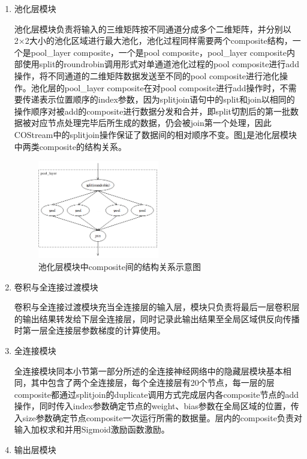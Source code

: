 \begin{enumerate}
\item 池化层模块

池化层模块负责将输入的三维矩阵按不同通道分成多个二维矩阵，并分别以2×2大小的池化区域进行最大池化，池化过程同样需要两个composite结构，一个是pool\_layer composite，一个是pool composite，pool\_layer composite内部使用split的roundrobin调用形式对单通道池化过程的pool composite进行add操作，将不同通道的二维矩阵数据发送至不同的pool composite进行池化操作。池化层的pool\_layer composite在对pool composite进行add操作时，不需要传递表示位置顺序的index参数，因为splitjoin语句中的split和join以相同的操作顺序对被add的composite进行数据分发和合并，即split切割后的第一批数据被对应节点处理完毕后所生成的数据，仍会被join第一个处理，因此COStream中的splitjoin操作保证了数据间的相对顺序不变。图\ref{fig:cnn_pooling_layer}是池化层模块中两类composite的结构关系。

\begin{figure}[!t]
\centering
\includegraphics[width=0.5\textwidth]{../img/Chap_Application/Yu/cnn_pooling_layer.png}
\caption{池化层模块中composite间的结构关系示意图}
\label{fig:cnn_pooling_layer}
\end{figure}

\item 卷积与全连接过渡模块

卷积与全连接过渡模块充当全连接层的输入层，模块只负责将最后一层卷积层的输出结果转发给下层全连接层，同时记录此输出结果至全局区域供反向传播时第一层全连接层参数梯度的计算使用。

\item 全连接模块

全连接模块同本小节第一部分所述的全连接神经网络中的隐藏层模块基本相同，其中包含了两个全连接层，每个全连接层有20个节点，每一层的层composite都通过splitjoin的duplicate调用方式完成层内各composite节点的add操作，同时传入index参数确定节点的weight、bias参数在全局区域的位置，传入size参数确定节点composite一次运行所需的数据量。层内的composite负责对输入加权求和并用Sigmoid激励函数激励。

\item 输出层模块


\end{enumerate}
